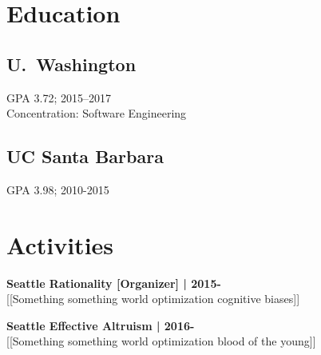 \documentclass[]{resume}
\begin{document}
%
%
\lastupdated
\github

%
%

%
%

\begin{minipage}[t]{0.33\textwidth}


\section{Education}

\subsection{U.~Washington}
GPA 3.72; 2015--2017 \\
Concentration: Software Engineering
\sectionsep

\subsection{UC Santa Barbara}
GPA 3.98; 2010-2015
\sectionsep


\section{Activities}
\textbf{Seattle Rationality [Organizer] | 2015-}\\
{[[}Something something world optimization cognitive biases{]]}
\sectionsep

\textbf{Seattle Effective Altruism | 2016-}\\
{[[}Something something world optimization blood of the young{]]}
\sectionsep



\end{minipage}
\end{document}
